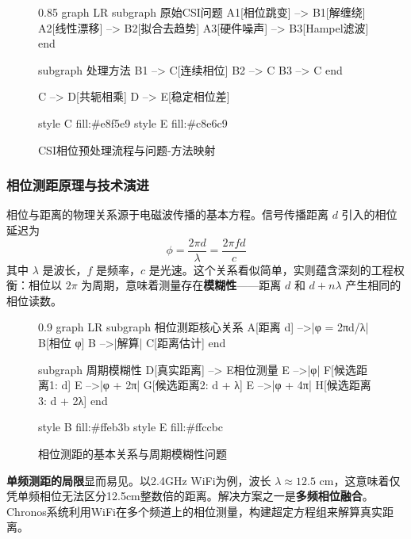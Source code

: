 \begin{figure}[htbp]
    \centering
    \begin{mmd}{0.85\textwidth}
graph LR
    subgraph 原始CSI问题
        A1[相位跳变] --> B1[解缠绕]
        A2[线性漂移] --> B2[拟合去趋势]
        A3[硬件噪声] --> B3[Hampel滤波]
    end
    
    subgraph 处理方法
        B1 --> C[连续相位]
        B2 --> C
        B3 --> C
    end
    
    C --> D[共轭相乘]
    D --> E[稳定相位差]
    
    style C fill:#e8f5e9
    style E fill:#c8e6c9
    \end{mmd}
    \caption{CSI相位预处理流程与问题-方法映射}
    \label{fig:csi-phase-processing}
\end{figure}

\subsubsection{相位测距原理与技术演进}

相位与距离的物理关系源于电磁波传播的基本方程。信号传播距离 $d$ 引入的相位延迟为
\begin{equation}
    \phi = \frac{2\pi d}{\lambda} = \frac{2\pi f d}{c}
\end{equation}
其中 $\lambda$ 是波长，$f$ 是频率，$c$ 是光速。这个关系看似简单，实则蕴含深刻的工程权衡：相位以 $2\pi$ 为周期，意味着测量存在\textbf{模糊性}——距离 $d$ 和 $d + n\lambda$ 产生相同的相位读数。

\begin{figure}[htbp]
    \centering
    \begin{mmd}{0.9\textwidth}
graph LR
    subgraph 相位测距核心关系
        A[距离 d] -->|φ = 2πd/λ| B[相位 φ]
        B -->|解算| C[距离估计]
    end
    
    subgraph 周期模糊性
        D[真实距离] --> E{相位测量}
        E -->|φ| F[候选距离1: d]
        E -->|φ + 2π| G[候选距离2: d + λ]
        E -->|φ + 4π| H[候选距离3: d + 2λ]
    end
    
    style B fill:#ffeb3b
    style E fill:#ffccbc
    \end{mmd}
    \caption{相位测距的基本关系与周期模糊性问题}
    \label{fig:phase-ranging-principle}
\end{figure}

\textbf{单频测距的局限}显而易见。以2.4GHz WiFi为例，波长 $\lambda \approx 12.5$ cm，这意味着仅凭单频相位无法区分12.5cm整数倍的距离。解决方案之一是\textbf{多频相位融合}。Chronos系统利用WiFi在多个频道上的相位测量，构建超定方程组来解算真实距离。

